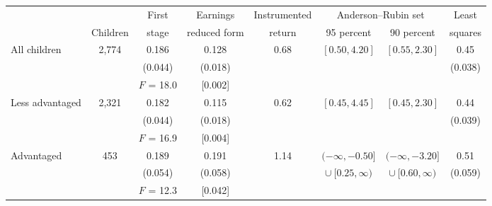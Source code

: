 \setlength{\tabcolsep}{4pt}
\begin{tabular}{@{}lccccccc@{}}
\toprule
& & First & Earnings & Instrumented & \multicolumn{2}{c}{Anderson--Rubin set} & Least \\
\cmidrule(lr){6-7}
& Children & stage & reduced form & return & 95 percent & 90 percent & squares \\
\midrule
All children & 2,774 & 0.186\rlap{**} & 0.128\rlap{***} & 0.68 & $[0.50, 4.20]$ & $[0.55, 2.30]$ & 0.45 \\
 &  & (0.044) & (0.018) &  &  &  & (0.038) \\
 &  & $F$ = 18.0 & [0.002] &  &  &  &  \\
\addlinespace
Less advantaged & 2,321 & 0.182\rlap{**} & 0.115\rlap{***} & 0.62 & $[0.45, 4.45]$ & $[0.45, 2.30]$ & 0.44 \\
 &  & (0.044) & (0.018) &  &  &  & (0.039) \\
 &  & $F$ = 16.9 & [0.004] &  &  &  &  \\
\addlinespace
Advantaged & 453 & 0.189\rlap{*} & 0.191\rlap{**} & 1.14 & $(-\infty, -0.50]$ & $(-\infty, -3.20]$ & 0.51 \\
 &  & (0.054) & (0.058) &  & $\cup\ [0.25, \infty)$ & $\cup\ [0.60, \infty)$ & (0.059) \\
 &  & $F$ = 12.3 & [0.042] &  &  &  &  \\
\bottomrule
\end{tabular}
